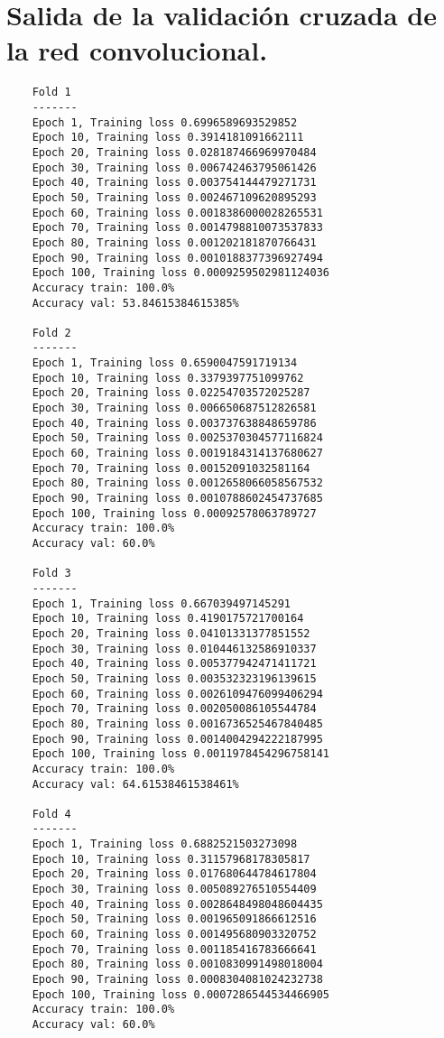 \section{Salida de la validación cruzada de la red convolucional.}

\begin{verbatim}
    Fold 1
    -------
    Epoch 1, Training loss 0.6996589693529852
    Epoch 10, Training loss 0.3914181091662111
    Epoch 20, Training loss 0.028187466969970484
    Epoch 30, Training loss 0.006742463795061426
    Epoch 40, Training loss 0.003754144479271731
    Epoch 50, Training loss 0.002467109620895293
    Epoch 60, Training loss 0.0018386000028265531
    Epoch 70, Training loss 0.0014798810073537833
    Epoch 80, Training loss 0.001202181870766431
    Epoch 90, Training loss 0.0010188377396927494
    Epoch 100, Training loss 0.0009259502981124036
    Accuracy train: 100.0%
    Accuracy val: 53.84615384615385%
    
    Fold 2
    -------
    Epoch 1, Training loss 0.6590047591719134
    Epoch 10, Training loss 0.3379397751099762
    Epoch 20, Training loss 0.02254703572025287
    Epoch 30, Training loss 0.006650687512826581
    Epoch 40, Training loss 0.003737638848659786
    Epoch 50, Training loss 0.0025370304577116824
    Epoch 60, Training loss 0.0019184314137680627
    Epoch 70, Training loss 0.00152091032581164
    Epoch 80, Training loss 0.0012658066058567532
    Epoch 90, Training loss 0.0010788602454737685
    Epoch 100, Training loss 0.00092578063789727
    Accuracy train: 100.0%
    Accuracy val: 60.0%
    
    Fold 3
    -------
    Epoch 1, Training loss 0.667039497145291
    Epoch 10, Training loss 0.4190175721700164
    Epoch 20, Training loss 0.04101331377851552
    Epoch 30, Training loss 0.010446132586910337
    Epoch 40, Training loss 0.005377942471411721
    Epoch 50, Training loss 0.003532323196139615
    Epoch 60, Training loss 0.0026109476099406294
    Epoch 70, Training loss 0.002050086105544784
    Epoch 80, Training loss 0.0016736525467840485
    Epoch 90, Training loss 0.0014004294222187995
    Epoch 100, Training loss 0.0011978454296758141
    Accuracy train: 100.0%
    Accuracy val: 64.61538461538461%
    
    Fold 4
    -------
    Epoch 1, Training loss 0.6882521503273098
    Epoch 10, Training loss 0.31157968178305817
    Epoch 20, Training loss 0.017680644784617804
    Epoch 30, Training loss 0.005089276510554409
    Epoch 40, Training loss 0.0028648498048604435
    Epoch 50, Training loss 0.001965091866612516
    Epoch 60, Training loss 0.001495680903320752
    Epoch 70, Training loss 0.001185416783666641
    Epoch 80, Training loss 0.0010830991498018004
    Epoch 90, Training loss 0.0008304081024232738
    Epoch 100, Training loss 0.0007286544534466905
    Accuracy train: 100.0%
    Accuracy val: 60.0%
    

\end{verbatim}
